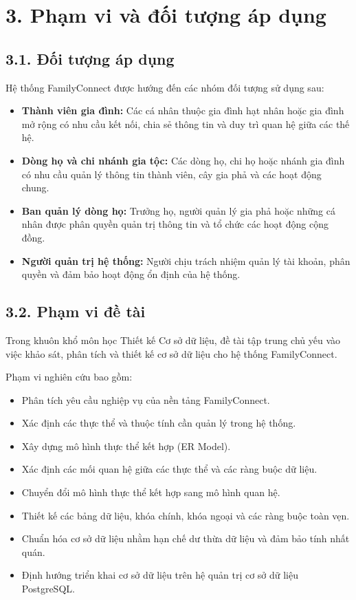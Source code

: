 \section*{3. Phạm vi và đối tượng áp dụng}
{}

\subsection*{3.1. Đối tượng áp dụng}
{}

Hệ thống FamilyConnect được hướng đến các nhóm đối tượng sử dụng sau:

\begin{itemize}[leftmargin=*]
\item \textbf{Thành viên gia đình:} Các cá nhân thuộc gia đình hạt nhân hoặc gia đình mở rộng có nhu cầu kết nối, chia sẻ thông tin và duy trì quan hệ giữa các thế hệ.
\item \textbf{Dòng họ và chi nhánh gia tộc:} Các dòng họ, chi họ hoặc nhánh gia đình có nhu cầu quản lý thông tin thành viên, cây gia phả và các hoạt động chung.
\item \textbf{Ban quản lý dòng họ:} Trưởng họ, người quản lý gia phả hoặc những cá nhân được phân quyền quản trị thông tin và tổ chức các hoạt động cộng đồng.
\item \textbf{Người quản trị hệ thống:} Người chịu trách nhiệm quản lý tài khoản, phân quyền và đảm bảo hoạt động ổn định của hệ thống.
\end{itemize}

\subsection*{3.2. Phạm vi đề tài}
{}

Trong khuôn khổ môn học Thiết kế Cơ sở dữ liệu, đề tài tập trung chủ yếu vào việc khảo sát, phân tích và thiết kế cơ sở dữ liệu cho hệ thống FamilyConnect.

Phạm vi nghiên cứu bao gồm:

\begin{itemize}[leftmargin=*]
\item Phân tích yêu cầu nghiệp vụ của nền tảng FamilyConnect.
\item Xác định các thực thể và thuộc tính cần quản lý trong hệ thống.
\item Xây dựng mô hình thực thể kết hợp (ER Model).
\item Xác định các mối quan hệ giữa các thực thể và các ràng buộc dữ liệu.
\item Chuyển đổi mô hình thực thể kết hợp sang mô hình quan hệ.
\item Thiết kế các bảng dữ liệu, khóa chính, khóa ngoại và các ràng buộc toàn vẹn.
\item Chuẩn hóa cơ sở dữ liệu nhằm hạn chế dư thừa dữ liệu và đảm bảo tính nhất quán.
\item Định hướng triển khai cơ sở dữ liệu trên hệ quản trị cơ sở dữ liệu PostgreSQL.
\end{itemize}

